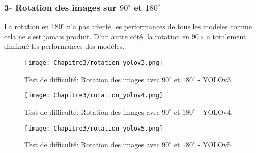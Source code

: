           \subsubsection{3- Rotation des images sur $90^\circ$ et $180^\circ$}
          La rotation en $180^\circ$ n'a pas affecté les performances de tous les modèles comme cela ne s'est jamais produit. D'un autre côté, la rotation en $90\circ$ a totalement diminué les performances des modèles.
          \begin{figure}[H]
               \centering
                \texttt{[image: Chapitre3/rotation\_yolov3.png]}
                \caption{Test de difficulté: Rotation des images avec $90^\circ$ et $180^\circ$ - YOLOv3.}
                \label{y3_t5}
                \end{figure}
          \begin{figure}[H]
                    \centering
                    \texttt{[image: Chapitre3/rotation\_yolov4.png]}
                    \caption{Test de difficulté: Rotation des images avec $90^\circ$ et $180^\circ$ - YOLOv4.}
                    \label{y4_t4}
                    \end{figure}
          \begin{figure}[H]
                    \centering
                    \texttt{[image: Chapitre3/rotation\_yolov5.png]}
                    \caption{Test de difficulté: Rotation des images avec $90^\circ$ et $180^\circ$ - YOLOv5.}
                    \label{y5_t4}
                    \end{figure}

